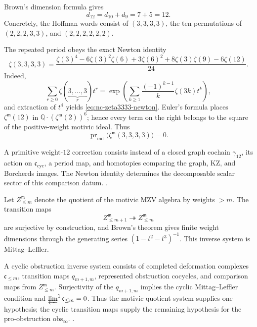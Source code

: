 \begin{remark}
\label{rem:nc-phi12}
Brown's dimension formula gives
\[
 d_{12}=d_{10}+d_9=7+5=12.
\]
Concretely, the Hoffman words consist of
\((3,3,3,3)\), the ten permutations of
\((2,2,2,3,3)\), and \((2,2,2,2,2,2)\).

The repeated period obeys the exact Newton identity
\begin{equation}
\label{eq:nc-zeta3333-newton}
 \zeta(3,3,3,3)
 =
 \frac{\zeta(3)^4-6\zeta(3)^2\zeta(6)+3\zeta(6)^2
 +8\zeta(3)\zeta(9)-6\zeta(12)}{24}.
\end{equation}
Indeed,
\[
 \sum_{r\geq0}\zeta(\underbrace{3,\ldots,3}_{r})t^r
 =
 \exp\!\left(
  \sum_{k\geq1}\frac{(-1)^{k-1}}{k}\zeta(3k)t^k
 \right),
\]
and extraction of \(t^4\) yields
\eqref{eq:nc-zeta3333-newton}.  Euler's formula places
\(\zeta^{\mathfrak m}(12)\) in
\(\mathbb Q\cdot(\zeta^{\mathfrak m}(2))^6\); hence every term on the
right belongs to the square of the positive-weight motivic ideal.
Thus
\[
 \operatorname{pr}_{\mathrm{ind}}
 \bigl(\zeta^{\mathfrak m}(3,3,3,3)\bigr)=0.
\]

A primitive weight-$12$ correction consists instead of a closed graph
cochain \(\gamma_{12}\), its action on
\(\mathfrak c_{\mathrm{cyc}}\), a period map, and homotopies comparing
the graph, KZ, and Borcherds images.  The Newton identity determines
the decomposable scalar sector of this comparison datum.
\cite{Brown2011,Brown2012,Hoffman1997}.
\end{remark}

\begin{remark}
\label{rem:nc-ML-prolimit-12}
Let \(Z_{\leq m}^{\mathfrak m}\) denote the quotient of the motivic MZV
algebra by weights \(>m\).  The transition maps
\[
 Z_{\leq m+1}^{\mathfrak m}\twoheadrightarrow Z_{\leq m}^{\mathfrak m}
\]
are surjective by construction, and Brown's theorem gives finite
weight dimensions through the generating series
\((1-t^2-t^3)^{-1}\).  This inverse system is Mittag--Leffler.

A cyclic obstruction inverse system consists of completed deformation
complexes \(\mathfrak c_{\leq m}\), transition maps
\(q_{m+1,m}\), represented obstruction cocycles, and comparison maps
from \(Z_{\leq m}^{\mathfrak m}\).  Surjectivity of the
\(q_{m+1,m}\) implies the cyclic Mittag--Leffler condition and
\(\varprojlim^1\mathfrak c_{\leq m}=0\).  Thus the motivic quotient
system supplies one hypothesis; the cyclic transition maps supply the
remaining hypothesis for the pro-obstruction
\(\mathrm{obs}_\infty\).
\cite{Brown2011,MarklShniderStasheff2002}.
\end{remark}

